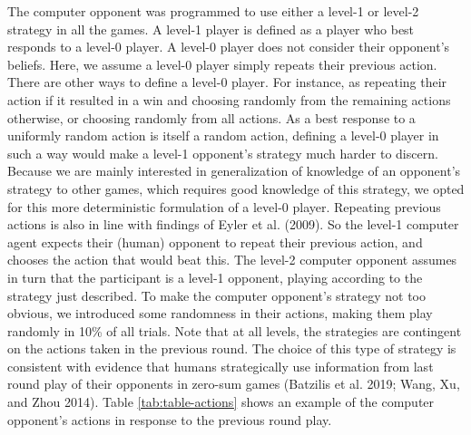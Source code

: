 \documentclass[smallextended]{svjour3}       %
\begin{document}
The computer opponent was programmed to use either a level-1 or level-2
strategy in all the games. A level-1 player is defined as a player who
best responds to a level-0 player. A level-0 player does not consider
their opponent's beliefs. Here, we assume a level-0 player simply
repeats their previous action. There are other ways to define a level-0
player. For instance, as repeating their action if it resulted in a win
and choosing randomly from the remaining actions otherwise, or choosing
randomly from all actions. As a best response to a uniformly random
action is itself a random action, defining a level-0 player in such a
way would make a level-1 opponent's strategy much harder to discern.
Because we are mainly interested in generalization of knowledge of an
opponent's strategy to other games, which requires good knowledge of
this strategy, we opted for this more deterministic formulation of a
level-0 player. Repeating previous actions is also in line with findings
of Eyler et al. (2009). So the level-1 computer agent expects their
(human) opponent to repeat their previous action, and chooses the action
that would beat this. The level-2 computer opponent assumes in turn that
the participant is a level-1 opponent, playing according to the strategy
just described. To make the computer opponent's strategy not too
obvious, we introduced some randomness in their actions, making them
play randomly in 10\% of all trials. Note that at all levels, the
strategies are contingent on the actions taken in the previous round.
The choice of this type of strategy is consistent with evidence that
humans strategically use information from last round play of their
opponents in zero-sum games (Batzilis et al. 2019; Wang, Xu, and Zhou
2014). Table \ref{tab:table-actions} shows an example of the computer
opponent's actions in response to the previous round play.

\begin{table}

\caption{\label{tab:table-actions}Example of how a level-1 and level-2 computer agent plays in response to actions taken in the previous round}
\centering
{}
\end{table}
\end{document}
